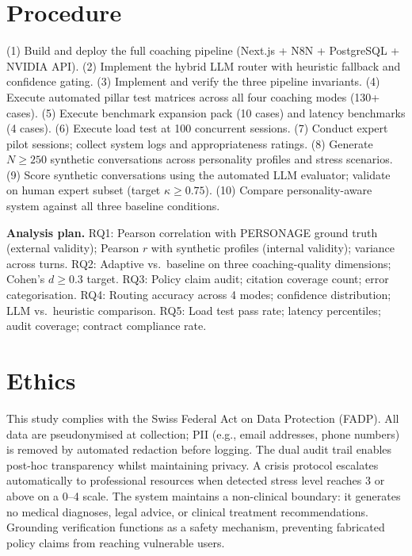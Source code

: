 \documentclass[10pt,a4paper]{report}
\begin{document}
\section{Procedure}

(1) Build and deploy the full coaching pipeline (Next.js + N8N + PostgreSQL + NVIDIA API). (2) Implement the hybrid LLM router with heuristic fallback and confidence gating. (3) Implement and verify the three pipeline invariants. (4) Execute automated pillar test matrices across all four coaching modes (130+ cases). (5) Execute benchmark expansion pack (10 cases) and latency benchmarks (4 cases). (6) Execute load test at 100 concurrent sessions. (7) Conduct expert pilot sessions; collect system logs and appropriateness ratings. (8) Generate $N \geq 250$ synthetic conversations across personality profiles and stress scenarios. (9) Score synthetic conversations using the automated LLM evaluator; validate on human expert subset (target $\kappa \geq 0.75$). (10) Compare personality-aware system against all three baseline conditions.

\textbf{Analysis plan.} RQ1: Pearson correlation with PERSONAGE ground truth (external validity); Pearson $r$ with synthetic profiles (internal validity); variance across turns. RQ2: Adaptive vs.\ baseline on three coaching-quality dimensions; Cohen's $d \geq 0.3$ target. RQ3: Policy claim audit; citation coverage count; error categorisation. RQ4: Routing accuracy across 4 modes; confidence distribution; LLM vs.\ heuristic comparison. RQ5: Load test pass rate; latency percentiles; audit coverage; contract compliance rate.

\section{Ethics}

This study complies with the Swiss Federal Act on Data Protection (FADP). All data are pseudonymised at collection; PII (e.g., email addresses, phone numbers) is removed by automated redaction before logging. The dual audit trail enables post-hoc transparency whilst maintaining privacy. A crisis protocol escalates automatically to professional resources when detected stress level reaches 3 or above on a 0--4 scale. The system maintains a non-clinical boundary: it generates no medical diagnoses, legal advice, or clinical treatment recommendations. Grounding verification functions as a safety mechanism, preventing fabricated policy claims from reaching vulnerable users.
\end{document}
